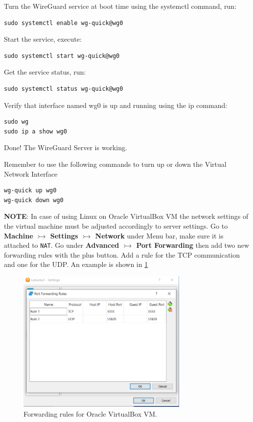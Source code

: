 Turn the WireGuard service at boot time using the systemctl command, run:
\begin{lstlisting}
sudo systemctl enable wg-quick@wg0
\end{lstlisting}

Start the service, execute:
\begin{lstlisting}
sudo systemctl start wg-quick@wg0
\end{lstlisting}

Get the service status, run:
\begin{lstlisting}
sudo systemctl status wg-quick@wg0
\end{lstlisting}

Verify that interface named wg0 is up and running using the ip command:
\begin{lstlisting}
sudo wg
sudo ip a show wg0
\end{lstlisting}

Done! The WireGuard Server is working.

Remember to use the following commands to turn up or down the Virtual Network Interface
\begin{lstlisting} 
wg-quick up wg0
wg-quick down wg0
\end{lstlisting}

\textbf{NOTE}: In case of using Linux on Oracle VirtualBox VM the network settings of the virtual machine must be adjusted accordingly to server settings.
Go to \textbf{Machine $\rightarrowtail$ Settings $\rightarrowtail$ Network} under Menu bar, make sure it is attached to \texttt{NAT}.
Go under \textbf{Advanced $\rightarrowtail$ Port Forwarding} then add two new forwarding rules with the plus button.
Add a rule for the TCP communication and one for the UDP. An example is shown in \ref{fig:Forwarding} 

\begin{figure}[H]
    \vspace{0.4cm}
    \centering
    \includegraphics[width=0.75\textwidth]{images/Forwarding.PNG}
    \caption{Forwarding rules for Oracle VirtualBox VM.}
    \label{fig:Forwarding} %
\end{figure}


